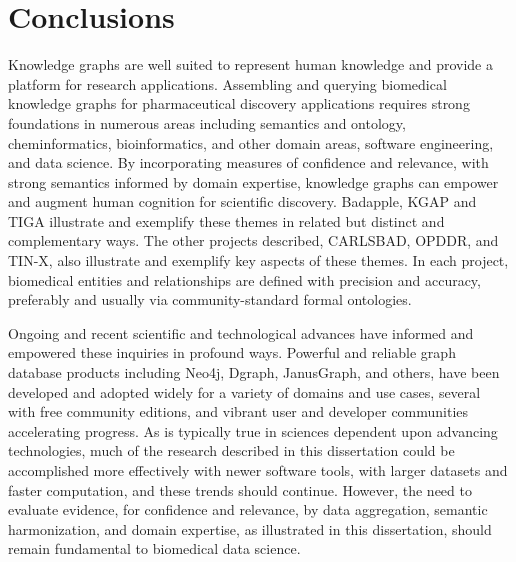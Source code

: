 \chapter{Conclusions}

Knowledge graphs are well suited to represent human knowledge and provide a platform for research applications.  Assembling and querying biomedical knowledge graphs for pharmaceutical discovery applications requires strong foundations in numerous areas including semantics and ontology, cheminformatics, bioinformatics, and other domain areas, software engineering, and data science. By incorporating measures of confidence and relevance, with strong semantics informed by domain expertise, knowledge graphs can empower and augment human cognition for scientific discovery. Badapple, KGAP and TIGA illustrate and exemplify these themes in related but distinct and complementary ways. The other projects described, CARLSBAD, OPDDR, and TIN-X, also illustrate and exemplify key aspects of these themes. In each project, biomedical entities and relationships are defined with precision and accuracy, preferably and usually via community-standard formal ontologies.

Ongoing and recent scientific and technological advances have informed and empowered these inquiries in profound ways. Powerful and reliable graph database products including Neo4j, Dgraph, JanusGraph, and others, have been developed and adopted widely for a variety of domains and use cases, several with free community editions, and vibrant user and developer communities accelerating progress. As is typically true in sciences dependent upon advancing technologies, much of the research described in this dissertation could be accomplished more effectively with newer software tools, with larger datasets and faster computation, and these trends should continue. However, the need to evaluate evidence, for confidence and relevance, by data aggregation, semantic harmonization, and domain expertise, as illustrated in this dissertation, should remain fundamental to biomedical data science.
